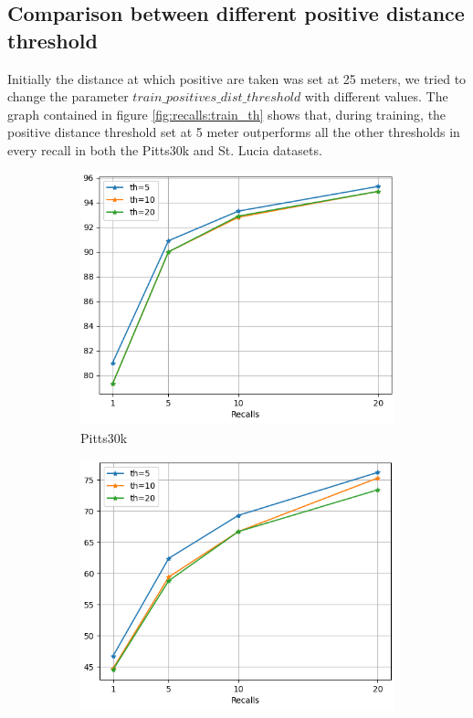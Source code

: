 \documentclass[10pt,twocolumn,letterpaper]{article}
\begin{document}
\subsection{Comparison between different positive distance threshold}
Initially the distance at which positive are taken was set at 25 meters, we tried to change the parameter ${train\_positives\_dist\_threshold}$ with different values. The graph contained in figure \ref{fig:recalls:train_th} shows that, during training, the positive distance threshold set at 5 meter outperforms all the other thresholds in every recall in both the Pitts30k and St. Lucia datasets.\\
\begin{figure}
	\centering
	\begin{subfigure}[b]{0.23\textwidth}
		\centering
		\includegraphics[width=\textwidth]{img/train_th/test_pitts30k_recalls_graph.png}
		\caption{Pitts30k}
		\label{fig:recalls:train_th:pitts30k}
	\end{subfigure}
	\hfill
	\begin{subfigure}[b]{0.23\textwidth}
		\centering
		\includegraphics[width=\textwidth]{img/train_th/test_st_lucia_recalls_graph.png}

\end{subfigure}
\end{figure}
\end{document}
